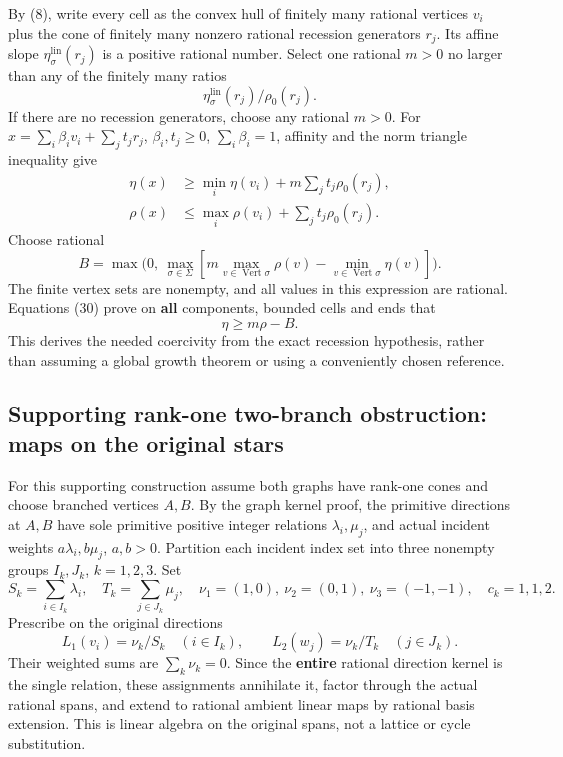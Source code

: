 \documentclass[
  11pt,
]{article}
\begin{document}
By (8), write every cell as the convex hull of finitely many rational
vertices \(v_i\) plus the cone of finitely many nonzero rational
recession generators \(r_j\). Its affine slope
\(\eta_\sigma^{\mathrm{lin}}(r_j)\) is a positive rational number.
Select one rational \(m>0\) no larger than any of the finitely many
ratios \[
       \eta_\sigma^{\mathrm{lin}}(r_j)/\rho_0(r_j).            \tag{29}
\] If there are no recession generators, choose any rational \(m>0\).
For \(x=\sum_i\beta_iv_i+\sum_jt_jr_j\), \(\beta_i,t_j\geq0\),
\(\sum_i\beta_i=1\), affinity and the norm triangle inequality give \[
\begin{split}
\eta(x)&\geq\min_i\eta(v_i)+m\sum_jt_j\rho_0(r_j),\\
\rho(x)&\leq\max_i\rho(v_i)+\sum_jt_j\rho_0(r_j).
\end{split}                                                        \tag{30}
\] Choose rational \[
B=\max\bigl(0,\ \max_{\sigma\in\Sigma}
                 [m\max_{v\in\operatorname{Vert}\sigma}\rho(v)
                        -\min_{v\in\operatorname{Vert}\sigma}\eta(v)]\bigr).
\] The finite vertex sets are nonempty, and all values in this
expression are rational. Equations (30) prove on \textbf{all}
components, bounded cells and ends that \[
                         \eta\geq m\rho-B.                 \tag{31}
\] This derives the needed coercivity from the exact recession
hypothesis, rather than assuming a global growth theorem or using a
conveniently chosen reference.

\subsection{Supporting rank-one two-branch obstruction: maps on the
original
stars}\label{supporting-rank-one-two-branch-obstruction-maps-on-the-original-stars}

For this supporting construction assume both graphs have rank-one cones
and choose branched vertices \(A,B\). By the graph kernel proof, the
primitive directions at \(A,B\) have sole primitive positive integer
relations \(\lambda_i,\mu_j\), and actual incident weights
\(a\lambda_i,b\mu_j\), \(a,b>0\). Partition each incident index set into
three nonempty groups \(I_k,J_k\), \(k=1,2,3\). Set \[
 S_k=\sum_{i\in I_k}\lambda_i,\quad T_k=\sum_{j\in J_k}\mu_j,
 \quad\nu_1=(1,0),\ \nu_2=(0,1),\ \nu_3=(-1,-1),\quad c_k=1,1,2.
\] Prescribe on the original directions \[
L_1(v_i)=\nu_k/S_k\quad(i\in I_k),\qquad
L_2(w_j)=\nu_k/T_k\quad(j\in J_k).                            \tag{32}
\] Their weighted sums are \(\sum_k\nu_k=0\). Since the \textbf{entire}
rational direction kernel is the single relation, these assignments
annihilate it, factor through the actual rational spans, and extend to
rational ambient linear maps by rational basis extension. This is linear
algebra on the original spans, not a lattice or cycle substitution.
\end{document}
